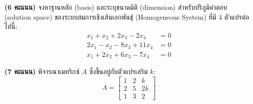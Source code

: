 ﻿\documentclass[12pt, a4paper]{exam}
\begin{document}
\begin{questions}
\question \textbf{(6 คะแนน)} จงหาฐานหลัก (basis) และระบุขนาดมิติ (dimension) สำหรับปริภูมิคำตอบ (solution space) ของระบบสมการเชิงเส้นเอกพันธุ์ (Homogeneous System) ที่มี 4 ตัวแปรต่อไปนี้:
\[
\begin{aligned}
x_1 + x_2 + 2x_3 - 2x_4 &= 0 \\
2x_1 - x_2 - 8x_3 + 11x_4 &= 0 \\
x_1 + 2x_2 + 6x_3 - 7x_4 &= 0
\end{aligned}
\]
\newpage

\question \textbf{(7 คะแนน)} พิจารณา\mbox{เมทริกซ์} $A$ ซึ่งขึ้นอยู่กับตัวแปรเสริม $k$:
\[
A = \begin{bmatrix} 1 & 2 & k \\ 2 & 5 & 2k \\ 1 & 3 & 2 \end{bmatrix}
\]
\newpage


\end{questions}
\end{document}
